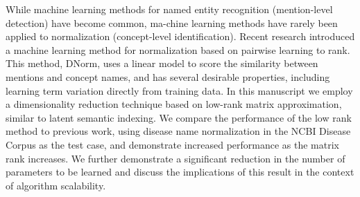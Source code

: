 While machine learning methods for named entity recognition (mention-level detection) have become common, ma-chine learning methods have rarely been applied to normalization (concept-level identification). Recent research introduced a machine learning method for normalization based on pairwise learning to rank. This method, DNorm, uses a linear model to score the similarity between mentions and concept names, and has several desirable properties, including learning term variation directly from training data. In this manuscript we employ a dimensionality reduction technique based on low-rank matrix approximation, similar to latent semantic indexing. We compare the performance of the low rank method to previous work, using disease name normalization in the NCBI Disease Corpus as the test case, and demonstrate increased performance as the matrix rank increases. We further demonstrate a significant reduction in the number of parameters to be learned and discuss the implications of this result in the context of algorithm scalability.
